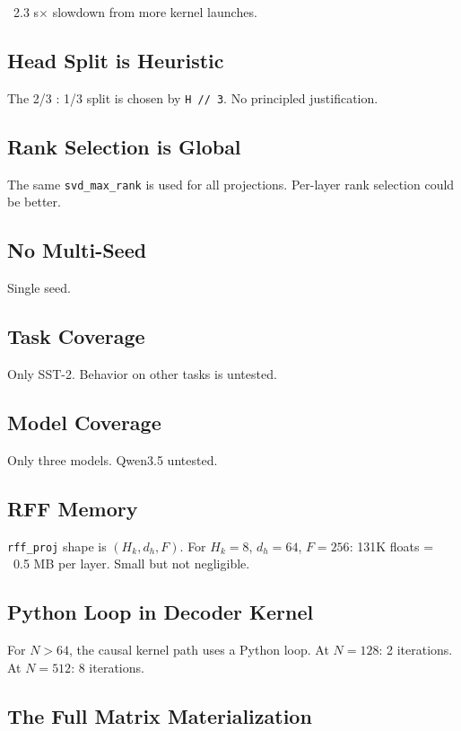 ~2.3 s$\times$ slowdown from more kernel launches.

\subsection{Head Split is Heuristic}

The 2/3 : 1/3 split is chosen by \texttt{H // 3}. No principled justification.

\subsection{Rank Selection is Global}

The same \texttt{svd\_max\_rank} is used for all projections. Per-layer rank 
selection could be better.

\subsection{No Multi-Seed}

Single seed.

\subsection{Task Coverage}

Only SST-2. Behavior on other tasks is untested.

\subsection{Model Coverage}

Only three models. Qwen3.5 untested.

\subsection{RFF Memory}

\texttt{rff\_proj} shape is $(H_k, d_h, F)$. For $H_k = 8$, $d_h = 64$, $F = 256$: 
131K floats = ~0.5 MB per layer. Small but not negligible.

\subsection{Python Loop in Decoder Kernel}

For $N > 64$, the causal kernel path uses a Python loop. At $N = 128$: 2 
iterations. At $N = 512$: 8 iterations.

\subsection{The Full Matrix Materialization}

